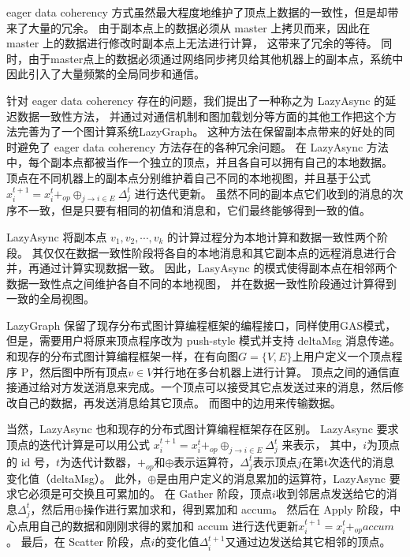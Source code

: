 eager data coherency 方式虽然最大程度地维护了顶点上数据的一致性，但是却带来了大量的冗余。
由于副本点上的数据必须从 master 上拷贝而来，因此在 master 上的数据进行修改时副本点上无法进行计算，
这带来了冗余的等待。
同时，由于master点上的数据必须通过网络同步拷贝给其他机器上的副本点，系统中因此引入了大量频繁的全局同步和通信。

针对 eager data coherency 存在的问题，我们提出了一种称之为 LazyAsync 的延迟数据一致性方法，
并通过对通信机制和图加载划分等方面的其他工作把这个方法完善为了一个图计算系统LazyGraph\cite{Wang@PPoPP18}。
这种方法在保留副本点带来的好处的同时避免了 eager data coherency 方法存在的各种冗余问题。
在 LazyAsync 方法中，每个副本点都被当作一个独立的顶点，并且各自可以拥有自己的本地数据。
顶点在不同机器上的副本点分别维护着自己不同的本地视图，并且基于公式
$x_{i}^{t+1}=x_{i}^{t}+_{o p} \oplus_{j \rightarrow i \in E} \Delta_{j}^{t}$
进行迭代更新。
虽然不同的副本点它们收到的消息的次序不一致，但是只要有相同的初值和消息和，它们最终能够得到一致的值\cite{zlj2018}。

LazyAsync 将副本点 $v_1 , v_2 , \cdots , v_k$ 的计算过程分为本地计算和数据一致性两个阶段。
其仅仅在数据一致性阶段将各自的本地消息和其它副本点的远程消息进行合并，再通过计算实现数据一致。
因此，LasyAsync 的模式使得副本点在相邻两个数据一致性点之间维护各自不同的本地视图，
并在数据一致性阶段通过计算得到一致的全局视图。


LazyGraph 保留了现存分布式图计算编程框架的编程接口，同样使用GAS模式，
但是，需要用户将原来顶点程序改为 push-style 模式并支持 deltaMsg 消息传递\cite{zlj2018}。
和现存的分布式图计算编程框架一样，在有向图$G = \{V, E\}$上用户定义一个顶点程序 P，然后图中所有顶点$v \in V$并行地在多台机器上进行计算。
顶点之间的通信直接通过给对方发送消息来完成。一个顶点可以接受其它点发送过来的消息，然后修改自己的数据，再发送消息给其它顶点。
而图中的边用来传输数据。


当然，LazyAsync 也和现存的分布式图计算编程框架存在区别。
LazyAsync 要求顶点的迭代计算是可以用公式 $x_i^{t+1} = x_i^t +_{op} \oplus_{j \rightarrow i \in E} \Delta_j^t$ 来表示，
其中，$i$为顶点的 id 号，$t$为迭代计数器，$+_{op}$和$\oplus$表示运算符，$\Delta_j^t$表示顶点$j$在第t次迭代的消息变化值（deltaMsg）。
此外，$\oplus$是由用户定义的消息累加的运算符，LazyAsync 要求它必须是可交换且可累加的。
在 Gather 阶段，顶点$i$收到邻居点发送给它的消息$\Delta_j^t$，然后用$\oplus$操作进行累加求和，得到累加和 accum。
然后在 Apply 阶段，中心点用自己的数据和刚刚求得的累加和 accum 进行迭代更新$x_i^{t+1} = x_i^t +_{op} accum$。
最后，在 Scatter 阶段，点$i$的变化值$\Delta_i^{t+1}$又通过边发送给其它相邻的顶点。


